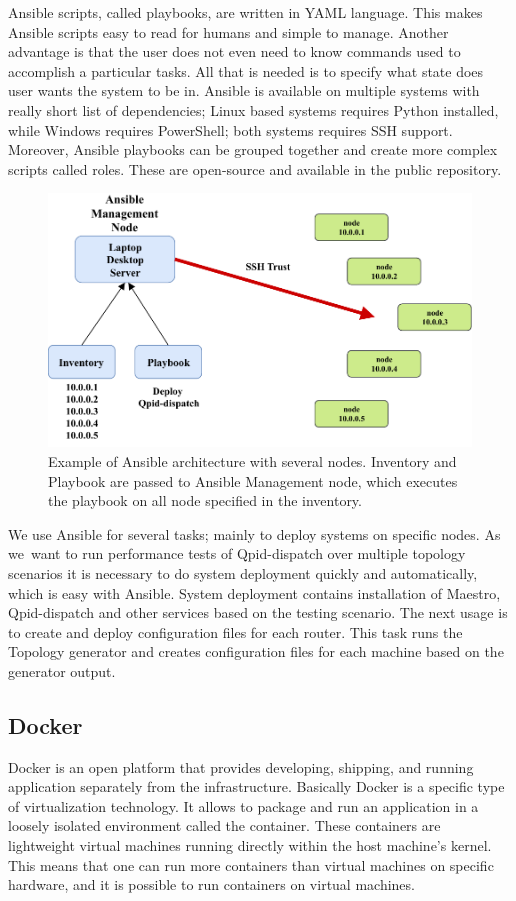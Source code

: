 Ansible scripts, called playbooks, are written in YAML language. This makes Ansible scripts easy to read for humans and simple to manage. Another advantage is that the user does not even need to know commands used to accomplish a particular tasks. All that is needed is to specify what state does user wants the system to be in. Ansible is available on multiple systems with really short list of dependencies; Linux based systems requires Python installed, while Windows requires PowerShell; both systems requires SSH support. Moreover, Ansible playbooks can be grouped together and create more complex scripts called roles. These are open-source and available in the public repository.

\begin{figure}[H]
  \centering
  \includegraphics[width=12cm]{obrazky-figures/ansible_architecture.pdf}
  \caption{Example of Ansible architecture with several nodes. Inventory and Playbook are passed to Ansible Management node, which executes the playbook on all node specified in the inventory.}
  \label{fig:ansible_architecture}
\end{figure}

We use Ansible for several tasks; mainly to deploy systems on specific nodes. As we~want to run performance tests of Qpid-dispatch over multiple topology scenarios it is necessary to do system deployment quickly and automatically, which is easy with Ansible. System deployment contains installation of Maestro, Qpid-dispatch and other services based on the testing scenario. The next usage is to create and deploy configuration files for each router. This task runs the Topology generator and creates configuration files for each machine based on the generator output.


\subsection{Docker}
Docker \cite{Docker} is an open platform that provides developing, shipping, and running application separately from the infrastructure. Basically Docker is a specific type of virtualization technology. It allows to package and run an application in a loosely isolated environment called the container. These containers are lightweight virtual machines running directly within the host machine's kernel. This means that one can run more containers than virtual machines on specific hardware, and it is possible to run containers on virtual machines.

